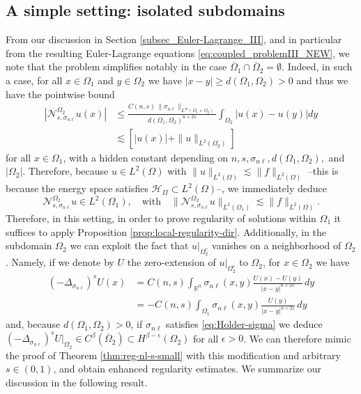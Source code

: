 \documentclass{amsart}
\newcommand{\Ol}{\Omega_{1}}%
\newcommand{\Onl}{\Omega_{2}}%
\newcommand{\snl}{{\sigma_{n\ell}}}
\def\R{{\mathbb R}}
\newcommand{\Nsnl}{\mathcal{N}_{s,\snl}}
\theoremstyle{plain}
\numberwithin{equation}{section}
\numberwithin{table}{section}
\numberwithin{figure}{section}
\numberwithin{theorem}{section}
\numberwithin{corollary}{section}
\numberwithin{definition}{section}
\numberwithin{lemma}{section}
\numberwithin{proposition}{section}
\numberwithin{remark}{section}
\begin{document}
\subsection{A simple setting: isolated subdomains} \label{sec:isolated-subdomains}
From our discussion in Section \ref{subsec_Euler-Lagrange_III}, and in particular from the resulting Euler-Lagrange equations \eqref{eq:coupled_problemIII_NEW}, we note that  the problem simplifies notably in the case $\overline\Ol \cap \overline\Onl = \emptyset$. Indeed, in such a case, for all $x \in \Ol$ and $y \in \Onl$ we have $|x-y| \ge d(\Ol, \Onl) > 0$ and thus we have the pointwise bound
\[ \begin{split}
|\Nsnl^{\Onl} u (x)| & \le \frac{C(n,s) \, \| \snl \|_{L^\infty(\Ol \times \Onl)}}{d(\Ol, \Onl)^{n+2s}}  \int_{\Onl} |u(x)-u(y)| dy \\
& \lesssim  \left[ |u(x)| + \| u \|_{L^2(\Onl)} \right] 
\end{split} \]
for all $x \in \Ol$, with a hidden constant depending on $n,s, \snl, d(\Ol, \Onl),$ and $|\Onl|$.
Therefore, because $u \in L^2(\Omega)$ with $\| u \|_{L^2(\Omega)}\lesssim \| f \|_{L^2(\Omega)}$ --this is  because the energy space satisfies $\mathcal{H}_{II}\subset L^2(\Omega)$--, we immediately deduce
\[
\Nsnl^{\Onl} u \in L^2(\Ol) , \quad \mbox{with} \quad \| \Nsnl^{\Onl} u \|_{L^2(\Ol)} \lesssim  \| f \|_{L^2(\Omega)}. 
\]
Therefore, in this setting, in order to prove regularity of solutions within $\Ol$ it suffices to apply Proposition \ref{prop:local-regularity-dir}.
%
Additionally, in the subdomain $\Onl$ we can exploit the fact that $u|_{\Onl^c}$ vanishes on a neighborhood of $\Onl$. Namely, if we denote by $U$ the zero-extension of $u|_{\Onl^c}$ to $\Onl$, for $x \in \Onl$ we have
\[ \begin{split}
(-\Delta_\snl)^s U (x) & = C(n,s) \int_{\R^n} \snl(x,y) \frac{U(x) - U(y)}{|x-y|^{n+2s}} \, dy \\ & = - C(n,s) \int_{\Ol} \snl(x,y) \frac{U(y)}{|x-y|^{n+2s}} \, dy
\end{split} \]
and, because $d(\Ol, \Onl) > 0$, if $\snl$ satisfies \eqref{eq:Holder-sigma} we deduce $(-\Delta_\snl)^s U |_{\Onl} \in C^\beta(\overline\Onl) \subset H^{\beta-\epsilon}(\Onl)$ for all $\epsilon > 0$. We can therefore mimic the proof of Theorem \ref{thm:reg-nl-s-small} with this modification and arbitrary $s \in (0,1)$, and obtain enhanced regularity estimates. We summarize our discussion in the following result.
\end{document}
